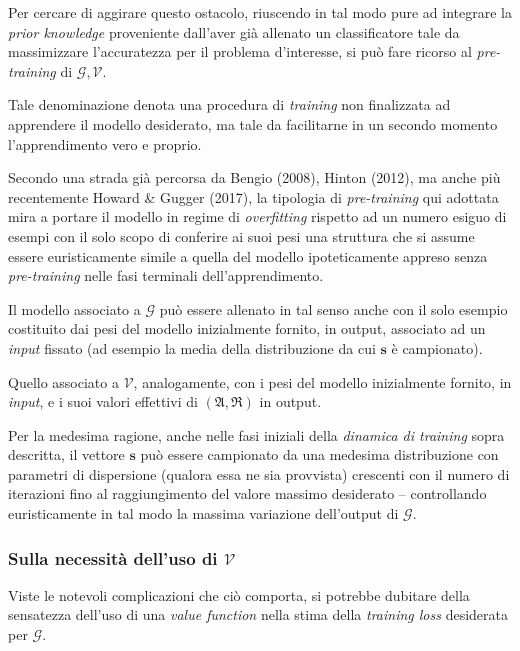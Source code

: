 \documentclass[a4paper, twoside]{article}
\begin{document}
Per cercare di aggirare questo ostacolo, riuscendo in tal modo pure ad integrare la \textit{prior knowledge} proveniente dall'aver già allenato un classificatore tale da massimizzare l'accuratezza per il problema d'interesse, si può fare ricorso al \textit{pre-training} di $\mathcal{G}, \mathcal{V}$.

Tale denominazione denota una procedura di \textit{training} non finalizzata ad apprendere il modello desiderato, ma tale da facilitarne in un secondo momento l'apprendimento vero e proprio.

Secondo una strada già percorsa da Bengio (2008), Hinton (2012), ma anche più recentemente Howard \& Gugger (2017), la tipologia di \textit{pre-training} qui adottata mira a portare il modello in regime di \textit{overfitting} rispetto ad un numero esiguo di esempi con il solo scopo di conferire ai suoi pesi una struttura che si assume essere euristicamente simile a quella del modello ipoteticamente appreso senza \textit{pre-training} nelle fasi terminali dell'apprendimento.

Il modello associato a $\mathcal{G}$ può essere allenato in tal senso anche con il solo esempio costituito dai pesi del modello inizialmente fornito, in output, associato ad un \textit{input} fissato (ad esempio la media della distribuzione da cui $\boldsymbol{s}$ è campionato).

Quello associato a $\mathcal{V}$, analogamente, con i pesi del modello inizialmente fornito, in \textit{input}, e i suoi valori effettivi di $({\mathfrak{A}},{\mathfrak{R}})$ in output.

Per la medesima ragione, anche nelle fasi iniziali della \textit{dinamica di training} sopra descritta, il vettore $\boldsymbol{s}$ può essere campionato da una medesima distribuzione con parametri di dispersione (qualora essa ne sia provvista) crescenti con il numero di iterazioni fino al raggiungimento del valore massimo desiderato -- controllando euristicamente in tal modo la massima variazione dell'output di $\mathcal{G}$.

\subsubsection{Sulla necessità dell'uso di $\mathcal{V}$}

Viste le notevoli complicazioni che ciò comporta, si potrebbe dubitare della sensatezza dell'uso di una \textit{value function} nella stima della \textit{training loss} desiderata per $\mathcal{G}$.
\end{document}
